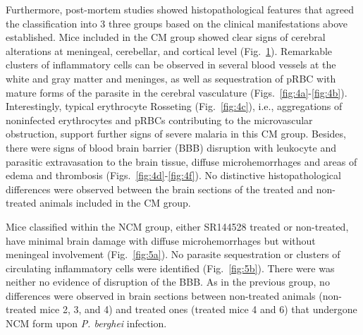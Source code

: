 \documentclass[empirical, authordate]{jote-new-article}
\begin{document}
\begin{figure}[t]
\begin{fullwidth}
{    }
    \caption{}
    \label{fig:4}
  \end{fullwidth}
\end{figure}

Furthermore, post-mortem studies showed histopathological features that agreed the classification into 3 three groups based on the clinical manifestations above established. Mice included in the CM group showed clear signs of cerebral alterations at meningeal, cerebellar, and cortical level (Fig.~\ref{fig:4}). Remarkable clusters of inflammatory cells can be observed in several blood vessels at the white and gray matter and meninges, as well as sequestration of pRBC with mature forms of the parasite in the cerebral vasculature (Figs.~\ref{fig:4a}-\ref{fig:4b}). Interestingly, typical erythrocyte Rosseting (Fig.~\ref{fig:4c}), i.e., aggregations of noninfected erythrocytes and pRBCs contributing to the microvascular obstruction, support further signs of severe malaria \parencite{Ross2007} in this CM group. Besides, there were signs of blood brain barrier (BBB) disruption with leukocyte and parasitic extravasation to the brain tissue, diffuse microhemorrhages and areas of edema and thrombosis (Figs.~\ref{fig:4d}-\ref{fig:4f}). No distinctive histopathological differences were observed between the brain sections of the treated and non-treated animals included in the CM group.

Mice classified within the NCM group, either SR144528 treated or non-treated, have minimal brain damage with diffuse microhemorrhages but without meningeal involvement (Fig.~\ref{fig:5a}). No parasite sequestration or clusters of circulating inflammatory cells were identified (Fig.~\ref{fig:5b}). There were was neither no evidence of disruption of the BBB. As in the previous group, no differences were observed in brain sections between non-treated animals (non-treated mice 2, 3, and 4) and treated ones (treated mice 4 and 6) that undergone NCM form upon \emph{P. berghei} infection.
\end{document}
